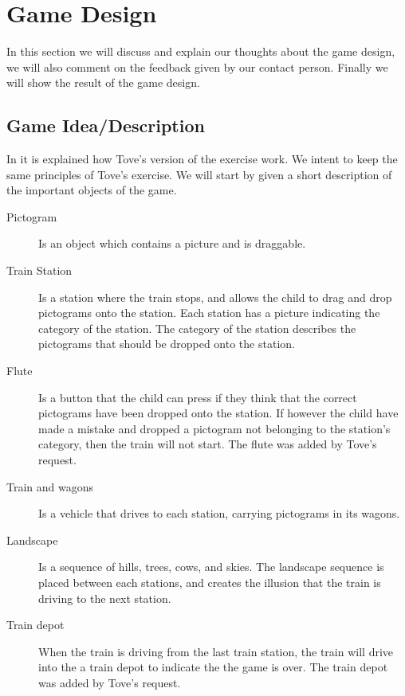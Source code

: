 \section{Game Design}
In this section we will discuss and explain our thoughts about the game design, we will also comment on the feedback given by our contact person. Finally we will show the result of the game design.

\subsection{Game Idea/Description}\label{sec:gameidea}
In  it is explained how Tove's version of the exercise work. We intent to keep the same principles of Tove's exercise. We will start by given a short description of the important objects of the game.

\begin{description}
\item[Pictogram] Is an object which contains a picture and is draggable.
\item[Train Station] Is a station where the train stops, and allows the child to drag and drop pictograms onto the station. Each station has a picture indicating the category of the station. The category of the station describes the pictograms that should be dropped onto the station.  

\item[Flute] Is a button that the child can press if they think that the correct pictograms have been dropped onto the station. If however the child have made a mistake and dropped a pictogram not belonging to the station's category, then the train will not start. The flute was added by Tove's request.

\item[Train and wagons] Is a vehicle that drives to each station, carrying pictograms in its wagons.

\item[Landscape] Is a sequence of hills, trees, cows, and skies. The landscape sequence is placed between each stations, and creates the illusion that the train is driving to the next station.

\item[Train depot] When the train is driving from the last train station, the train will drive into the a train depot to indicate the the game is over. The train depot was added by Tove's request.
\end{description}

